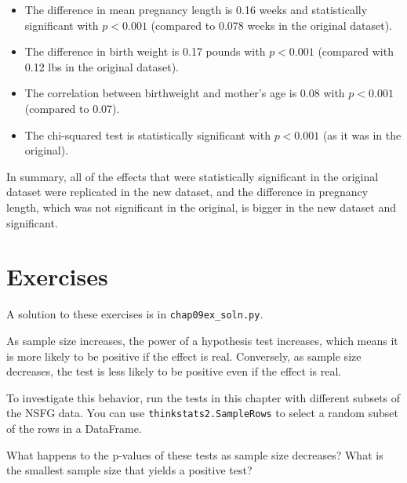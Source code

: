 \documentclass[12pt]{book}
\begin{document}
\begin{itemize}

\item The difference in mean pregnancy length is
0.16 weeks and statistically significant with $p < 0.001$ (compared
to 0.078 weeks in the original dataset).

\item The difference in birth weight is 0.17 pounds with $p < 0.001$
(compared with 0.12 lbs in the original dataset).

\item The correlation between birthweight and mother's age is
0.08 with $p < 0.001$ (compared to 0.07).

\item The chi-squared test is statistically significant with
$p < 0.001$ (as it was in the original).

\end{itemize}

In summary, all of the effects that were statistically significant
in the original dataset were replicated in the new dataset, and the
difference in pregnancy length, which was not significant in the
original, is bigger in the new dataset and significant.


\section{Exercises}

A solution to these exercises is in \verb"chap09ex_soln.py".

\begin{exercise}
As sample size increases, the power of a hypothesis test increases,
which means it is more likely to be positive if the effect is real.
Conversely, as sample size decreases, the test is less likely to
be positive even if the effect is real.

To investigate this behavior, run the tests in this chapter with
different subsets of the NSFG data.  You can use {\tt thinkstats2.SampleRows}
to select a random subset of the rows in a DataFrame.

What happens to the p-values of these tests as sample size decreases?
What is the smallest sample size that yields a positive test?
\end{exercise}
\end{document}
